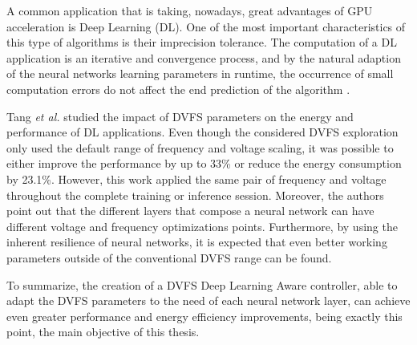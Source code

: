 A common application that is taking, nowadays, great advantages of GPU acceleration is Deep Learning (DL). One of the most important characteristics of this type of algorithms is their imprecision tolerance. The computation of a DL application is an iterative and convergence process, and by the natural adaption of the neural networks learning parameters in runtime, the occurrence of small computation errors do not affect the end prediction of the algorithm \cite{jiao_assessment_2017}.

Tang \textit{et al.} \cite{tang_impact_2019} studied the impact of DVFS parameters on the energy and performance of DL applications. Even though the considered DVFS exploration only used the default range of frequency and voltage scaling, it was possible to either improve the performance by up to 33\% or reduce the energy consumption by 23.1\%. However, this work applied the same pair of frequency and voltage throughout the complete training or inference session. Moreover, the authors point out that the different layers that compose a neural network can have different voltage and frequency optimizations points. Furthermore, by using the inherent resilience of neural networks, it is expected that even better working parameters outside of the conventional DVFS range can be found. 

To summarize, the creation of a DVFS Deep Learning Aware controller, able to adapt the DVFS parameters to the need of each neural network layer, can achieve even greater performance and energy efficiency improvements, being exactly this point, the main objective of this thesis.